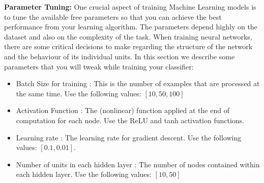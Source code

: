 \begin{enumerate}
\begin{enumerate}
  \textbf{Parameter Tuning:} One crucial aspect of training Machine Learning models is to tune the available free parameters so that you can achieve the best performance from your learning algorithm. The parameters depend highly on the dataset and also on the complexity of the task. When training neural networks, there are some critical decisions to make regarding the structure of the network and the behaviour of its individual units. In this section we describe some parameters that you will tweak while training your classifier:
  
	\begin{itemize}
		\item { Batch Size for training : 
		} This is the number of examples that are processed at the same time. Use the following values: $[10, 50, 100]$
		\item { Activation Function :
		} The (nonlinear) function applied at the end of computation for each node. Use the ReLU and tanh activation functions.
		\item { Learning rate :
		} The learning rate for gradient descent. Use the following values: $[0.1, 0.01]$.
		\item { Number of units in each hidden layer :
		} The number of nodes contained within each hidden layer. Use the following values: $[10, 50]$
	\end{itemize}


\end{enumerate}
\end{enumerate}
